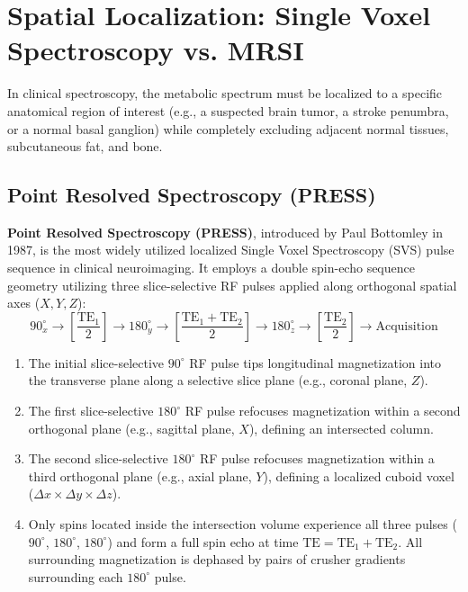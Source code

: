 \documentclass[11pt,a4paper]{article}
\begin{document}
\section{Spatial Localization: Single Voxel Spectroscopy vs. MRSI}
In clinical spectroscopy, the metabolic spectrum must be localized to a specific anatomical region of interest (e.g., a suspected brain tumor, a stroke penumbra, or a normal basal ganglion) while completely excluding adjacent normal tissues, subcutaneous fat, and bone.

\subsection{Point Resolved Spectroscopy (PRESS)}
\textbf{Point Resolved Spectroscopy (PRESS)}, introduced by Paul Bottomley in 1987, is the most widely utilized localized Single Voxel Spectroscopy (SVS) pulse sequence in clinical neuroimaging. It employs a double spin-echo sequence geometry utilizing three slice-selective RF pulses applied along orthogonal spatial axes ($X, Y, Z$):
\begin{equation}
    90^\circ_x \longrightarrow \left[ \frac{\text{TE}_1}{2} \right] \longrightarrow 180^\circ_y \longrightarrow \left[ \frac{\text{TE}_1 + \text{TE}_2}{2} \right] \longrightarrow 180^\circ_z \longrightarrow \left[ \frac{\text{TE}_2}{2} \right] \longrightarrow \text{Acquisition}
\end{equation}
\begin{enumerate}
    \item The initial slice-selective $90^\circ$ RF pulse tips longitudinal magnetization into the transverse plane along a selective slice plane (e.g., coronal plane, $Z$).
    \item The first slice-selective $180^\circ$ RF pulse refocuses magnetization within a second orthogonal plane (e.g., sagittal plane, $X$), defining an intersected column.
    \item The second slice-selective $180^\circ$ RF pulse refocuses magnetization within a third orthogonal plane (e.g., axial plane, $Y$), defining a localized cuboid voxel ($\Delta x \times \Delta y \times \Delta z$).
    \item Only spins located inside the intersection volume experience all three pulses ($90^\circ$, $180^\circ$, $180^\circ$) and form a full spin echo at time $\text{TE} = \text{TE}_1 + \text{TE}_2$. All surrounding magnetization is dephased by pairs of crusher gradients surrounding each $180^\circ$ pulse.
\end{enumerate}
\end{document}
